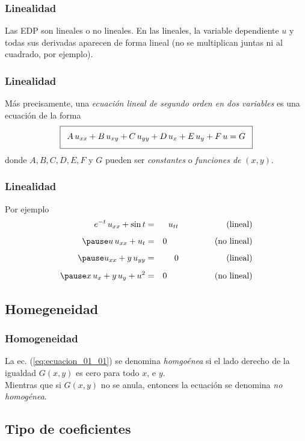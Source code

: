 \documentclass[12pt]{beamer}
\begin{document}
\begin{frame}
\frametitle{Linealidad}
Las EDP son lineales o no lineales. En las lineales, la variable dependiente $u$ y todas sus derivadas aparecen de forma lineal (no se multiplican juntas ni al cuadrado, por ejemplo).
\end{frame}
\begin{frame}
\frametitle{Linealidad}
Más precisamente, una \emph{ecuación lineal de segundo orden en dos variables} es una ecuación de la forma
\begin{align}
\addtolength{\fboxsep}{5pt}\boxed{ A \, u_{xx} + B \, u_{xy} + C \, u_{yy} + D \, u_{x} + E \, u_{y} + F \, u = G}
\label{eq:ecuacion_01_01}
\end{align}
donde $A, B, C, D, E, F$ y $G$ pueden ser \emph{constantes} o \emph{funciones de} $(x, y)$.
\end{frame}
\begin{frame}
\frametitle{Linealidad}
Por ejemplo
\begin{eqnarray*}
e^{-t} \, u_{xx} + \sin t &=& u_{tt} \hspace{2cm} \mbox{(lineal)} \\[0.5em] \pause
u \, u_{xx} + u_{t} &=& 0 \hspace{2cm} \mbox{(no lineal)} \\[0.5em] \pause
u_{xx} + y \, u_{yy} &=& 0 \hspace{2cm} \mbox{(lineal)} \\[0.5em] \pause
x \, u_{x} + y \, u_{y} + u^{2} &=& 0 \hspace{2cm} \mbox{(no lineal)}
\end{eqnarray*}
\end{frame}

\subsection*{Homegeneidad}

\begin{frame}
\frametitle{Homogeneidad}
La ec. (\ref{eq:ecuacion_01_01}) se denomina \emph{homgoénea} si el lado derecho de la igualdad $G(x, y)$ es cero para todo $x$, e $y$.
\\
\bigskip
Mientras que si $G(x, y)$ no se anula, entonces la ecuación se denomina \emph{no homogénea}.
\end{frame}

\subsection*{Tipo de coeficientes}
\end{document}
